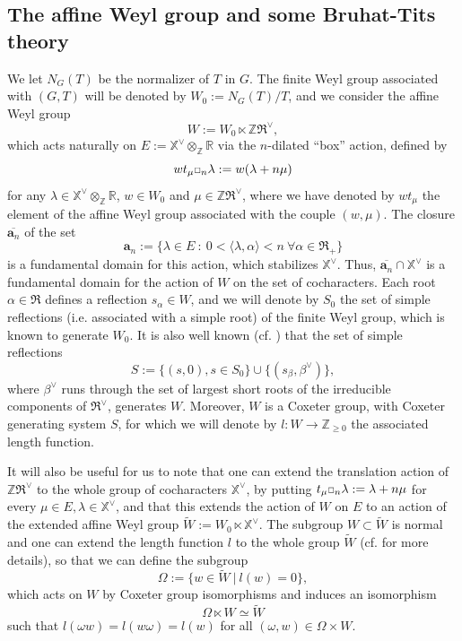 \documentclass[11pt]{amsart}
\theoremstyle{plain}
\theoremstyle{remark}
\newcommand{\car}{\mbox{\relsize{-5}$\Box$}}
\numberwithin{equation}{section}
\begin{document}
	\subsection{The affine Weyl group and some Bruhat-Tits theory}\label{The affine Weyl group and some Bruhat-Tits theory}
	We let $N_G(T)$ be the normalizer of $T$ in $G$. The finite Weyl group associated with $(G,T)$ will be denoted by $W_0:=N_G(T)/T$, and we consider the affine Weyl group
	$$W:=W_{0}\ltimes \mathbb{Z}\mathfrak{R}^\vee,$$
	which acts naturally on $E:=\mathbb{X}^\vee\otimes_\mathbb{Z} \mathbb{R}$ via the $n$-dilated ``box''  action, defined by $$wt_\mu\car_{n}\lambda:=w(\lambda+n\mu)$$ for any $\lambda\in \mathbb{X}^\vee\otimes_\mathbb{Z} \mathbb{R}$, $w\in W_{0}$ and $\mu\in \mathbb{Z}\mathfrak{R}^\vee$, where we have denoted by $wt_\mu$ the element of the affine Weyl group associated with the couple $(w,\mu)$. The closure $\overline{\mathbf{a}_n}$ of the set 
	$$\mathbf{a}_n:=\{\lambda\in E ~:~0<\langle\lambda,\alpha\rangle<n~\forall \alpha\in\mathfrak{R}_+\}$$ 
	is a fundamental domain for this action, which stabilizes $ \mathbb{X}^\vee$. Thus, $\overline{\mathbf{a}_n}\cap \mathbb{X}^\vee$ is a fundamental domain for the action of $W$ on the set of cocharacters. Each root $\alpha\in \mathfrak{R}$ defines a reflection $s_\alpha\in W$, and we will denote by $S_0$ the set of simple reflections (i.e. associated with a simple root) of the finite Weyl group, which is known to generate $W_0$. It is also well known (cf. \cite[II.6.3]{jantzen2003representations}) that the set of simple reflections 
	$$S:=\{(s,0),s\in S_0\}\cup\{(s_\beta,\beta^\vee)\},$$ where $\beta^\vee$ runs through the set of largest short roots of the irreducible components of $\mathfrak{R}^\vee$, generates $W$. Moreover, $W$ is a Coxeter group, with Coxeter generating system $S$, for which we will denote by $l:W\to \mathbb{Z}_{\geq0}$ the associated length function.
	
	It will also be useful for us to note that one can extend the translation action of $\mathbb{Z}\mathfrak{R}^\vee$ to the whole group of cocharacters $\mathbb{X}^\vee$, by putting $t_\mu\car_n\lambda:=\lambda+n\mu$ for every $\mu\in E,\lambda\in\mathbb{X}^\vee$, and that this extends the action of $W$ on $E$ to an action of the extended affine Weyl group $\tilde{W}:=W_0\ltimes\mathbb{X}^\vee$. The subgroup $W\subset \tilde{W}$ is normal and one can extend the length function $l$ to the whole group $\tilde{W}$ (cf. \cite[§2.1]{achar2021geometric} for more details), so that we can define the subgroup
	$$\Omega:=\{w\in \tilde{W}~|~l(w)=0\}, $$
	which acts on $W$ by Coxeter group isomorphisms and induces an isomorphism
	\begin{equation}\label{minuscule}
	    \Omega\ltimes W\simeq \tilde{W}
	\end{equation}
	such that $l(\omega w)=l(w\omega)=l(w)$ for all $(\omega,w)\in \Omega\times W$.
	
\end{document}
